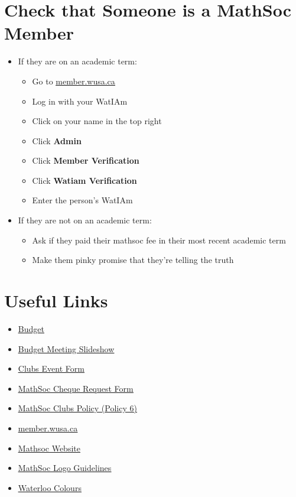\documentclass[utf8]{article}
\newcommand{\budget}{\href{https://drive.google.com/file/d/1uQIh7Qp33NX0TgJhl3DdY-r2HqZzQKuZ/view}{\underline{Budget} }}
\newcommand{\budgetSlideshow}{\href{https://docs.google.com/presentation/d/1STBZmvycCzdxlngaaHDIre7LndTr-057gBXYInwFuVg/edit?usp=sharing}{\underline{Budget Meeting Slideshow} }}
\renewcommand{\labelitemi}{$\square$}
\newcommand{\clubsEventForm}{\href{https://wusa.ca/clubs/clubs-important-forms/clubs-event-form/done?sid=41744&token=1a166c8e45c6113b0322bd3e34fa6fb4}{\underline{Clubs Event Form} }}
\newcommand{\chequeReimbursementForm}{\href{https://mathsoc.uwaterloo.ca/wp-content/uploads/2021/02/Club-Cheque-Request-Form.pdf}{\underline{MathSoc Cheque Request Form} }}
\newcommand{\mathsocClubPolicy}{\href{https://mathsoc.uwaterloo.ca/wp-content/uploads/Mathsoc_Policies-1.pdf}{\underline{MathSoc Clubs Policy (Policy 6)} }}
\newcommand{\membersite}{\href{https://member.wusa.ca/}{\underline{member.wusa.ca} }}
\newcommand{\mathsocsite}{\href{https://mathsoc.uwaterloo.ca/}{\underline{Mathsoc Website} }}
\newcommand{\mathsoclogo}{\href{https://drive.google.com/drive/folders/18v8yaagA74DqMqXaffVm3BGyS8Ze9e5m}{\underline{MathSoc Logo Guidelines} }}
\newcommand{\colorbrand}{\href{https://uwaterloo.ca/brand/how-express-waterloos-brand/colour}{\underline{Waterloo Colours} }}
\begin{document}
\section*{Check that Someone is a MathSoc Member}
\label{sec:membership}
\begin{itemize}
    \item If they are on an academic term:
    \begin{itemize}
        \item Go to \membersite
        \item Log in with your WatIAm
        \item Click on your name in the top right
        \item Click \textbf{Admin}
        \item Click \textbf{Member Verification}
        \item Click \textbf{Watiam Verification}
        \item Enter the person's WatIAm 
    \end{itemize}
    \item If they are not on an academic term:
    \begin{itemize}
        \item Ask if they paid their mathsoc fee in their most recent academic term
        \item Make them pinky promise that they're telling the truth
    \end{itemize}
\end{itemize}

\renewcommand\labelitemi{\textbullet}
\section*{Useful Links}
\label{sec:otherresources}
\begin{itemize}
    \item \budget
    \item \budgetSlideshow
    \item \clubsEventForm
    \item \chequeReimbursementForm
    \item \mathsocClubPolicy
    \item \membersite
    \item \mathsocsite
    \item \mathsoclogo
    \item \colorbrand
\end{itemize}
\end{document}
